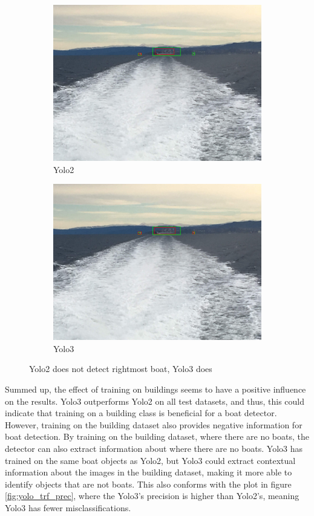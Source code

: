 \begin{figure}[h!]
\begin{subfigure}{.5\textwidth}
  \centering
  \includegraphics[width=0.8\linewidth]{results/case_buildings/yolotrf/Yolo2/IMG_2350.jpg}
  \caption{Yolo2}
\end{subfigure}%
\begin{subfigure}{.5\textwidth}
  \centering
  \includegraphics[width=.8\linewidth]{results/case_buildings/yolotrf/Yolo3/IMG_2350.jpg}
  \caption{Yolo3}
\end{subfigure}
\caption{Yolo2 does not detect rightmost boat, Yolo3 does}
\label{fig:Yolo3_better_trf}
\end{figure}

Summed up, the effect of training on buildings seems to have a positive influence on the results. Yolo3 outperforms Yolo2 on all test datasets, and thus, this could indicate that training on a building class is beneficial for a boat detector. However, training on the building dataset also provides negative information for boat detection. By training on the building dataset, where there are no boats, the detector can also extract information about where there are no boats. Yolo3 has trained on the same boat objects as Yolo2, but Yolo3 could extract contextual information about the images in the building dataset, making it more able to identify objects that are not boats. This also conforms with the plot in figure \ref{fig:yolo_trf_prec}, where the Yolo3's precision is higher than Yolo2's, meaning Yolo3 has fewer misclassifications.

